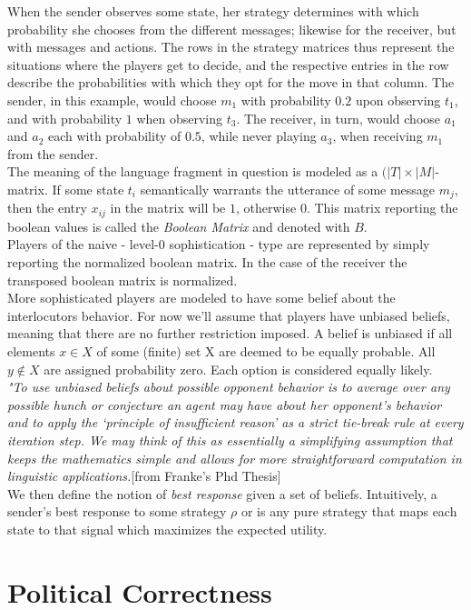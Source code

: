 \documentclass{article}
\begin{document}
When the sender observes some state, her strategy determines with which probability she chooses from the different messages; likewise for the receiver, but with messages and actions. The rows in the strategy matrices thus represent the situations where the players get to decide, and the respective entries in the row describe the probabilities with which they opt for the move in that column. The sender, in this example, would choose $m_1$ with probability $0.2$ upon observing $t_1$, and with probability $1$ when observing $t_3$. The receiver, in turn, would choose $a_1$ and $a_2$ each with probability of $0.5$, while never playing $a_3$, when receiving $m_1$ from the sender.\\
The meaning of the language fragment in question is modeled as a $(|T| \times |M|$-matrix. If some state $t_i$ semantically warrants the utterance of some message $m_j$, then the entry $x_{ij}$ in the matrix will be $1$, otherwise $0$. This matrix reporting the boolean values is called the \textit{Boolean Matrix}  and denoted with $B$.\\
Players of the naive - level-0 sophistication - type are represented by simply reporting the normalized boolean matrix. In the case of the receiver the transposed boolean matrix is normalized.\\
More sophisticated players are modeled to have some belief about the interlocutors behavior. For now we'll assume that players have unbiased beliefs, meaning that there are no further restriction imposed. A belief is unbiased if all elements $x\in X$ of some (finite) set X are deemed to be equally probable. All $y\not\in X$ are assigned probability zero. Each option is considered equally likely.\\
 \textit{"To use unbiased beliefs about possible opponent behavior is to average over any possible hunch or conjecture an agent may have about her opponent’s behavior and to apply the ‘principle of insufficient reason’ as a strict tie-break rule at every iteration step. We may think of this as essentially a simplifying assumption that keeps the mathematics simple and allows for more straightforward computation in linguistic applications.}[from Franke's Phd Thesis]\\
We then define the notion of \textit{best response} given a set of beliefs. Intuitively, a sender's best response to some strategy $\rho$ or is any pure strategy that maps each state to that signal which maximizes the expected utility.


\section{Political Correctness}
\end{document}
